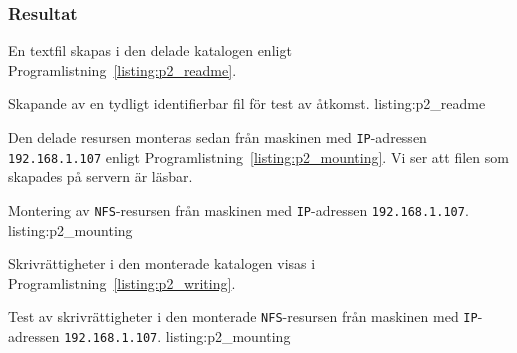 \subsubsection{Resultat}

En textfil skapas i den delade katalogen enligt 
Programlistning~\ref{listing:p2_readme}.

            {Skapande av en tydligt identifierbar fil för test av åtkomst.}
            {listing:p2_readme}

Den delade resursen monteras sedan från maskinen med \texttt{IP}-adressen
\texttt{192.168.1.107} enligt Programlistning~\ref{listing:p2_mounting}.
Vi ser att filen som skapades på servern är läsbar.

            {Montering av \texttt{NFS}-resursen från maskinen med
             \texttt{IP}-adressen \texttt{192.168.1.107}.}
            {listing:p2_mounting}

Skrivrättigheter i den monterade katalogen visas i 
Programlistning~\ref{listing:p2_writing}.

            {Test av skrivrättigheter i den monterade \texttt{NFS}-resursen 
             från maskinen med \texttt{IP}-adressen \texttt{192.168.1.107}.}
            {listing:p2_mounting}


